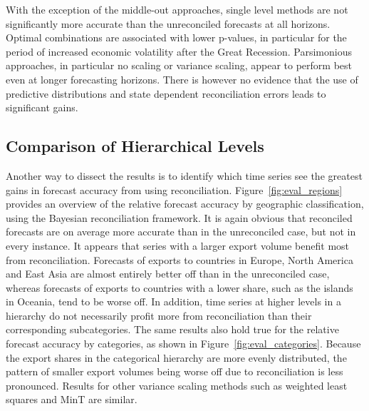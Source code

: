\documentclass[a4paper,fleqn,11pt]{article}
\begin{document}
With the exception of the middle-out approaches, single level methods are not significantly more accurate than the unreconciled forecasts at all horizons. Optimal combinations are associated with lower p-values, in particular for the period of increased economic volatility after the Great Recession. Parsimonious approaches, in particular no scaling or variance scaling, appear to perform best even at longer forecasting horizons. There is however no evidence that the use of predictive distributions and state dependent reconciliation errors leads to significant gains.

\subsection{Comparison of Hierarchical Levels}
Another way to dissect the results is to identify which time series see the greatest gains in forecast accuracy from using reconciliation. Figure~\ref{fig:eval_regions} provides an overview of the relative forecast accuracy by geographic classification, using the Bayesian reconciliation framework. It is again obvious that reconciled forecasts are on average more accurate than in the unreconciled case, but not in every instance. It appears that series with a larger export volume benefit most from reconciliation. Forecasts of exports to countries in Europe, North America and East Asia are almost entirely better off than in the unreconciled case, whereas forecasts of exports to countries with a lower share, such as the islands in Oceania, tend to be worse off. In addition, time series at higher levels in a hierarchy do not necessarily profit more from reconciliation than their corresponding subcategories. The same results also hold true for the relative forecast accuracy by categories, as shown in Figure~\ref{fig:eval_categories}. Because the export shares in the categorical hierarchy are more evenly distributed, the pattern of smaller export volumes being worse off due to reconciliation is less pronounced. Results for other variance scaling methods such as weighted least squares and MinT are similar.
\end{document}
